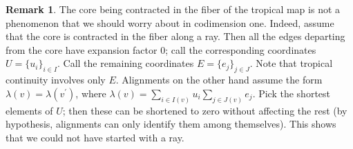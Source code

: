 \documentclass[11pt]{amsart}
\theoremstyle{definition}
\theoremstyle{definition}
\newtheorem{remark}[thm]{Remark}
\begin{document}
\begin{remark}
 The core being contracted in the fiber of the tropical map is not a phenomenon that we should worry about in codimension one. Indeed, assume that the core is contracted in the fiber along a ray. Then all the edges departing from the core have expansion factor $0$; call the corresponding coordinates $U=\{u_i\}_{i\in I}$. Call the remaining coordinates $E=\{e_j\}_{j\in J}$. Note that tropical continuity involves only $E$. Alignments on the other hand assume the form $\lambda(v)=\lambda(v^\prime)$, where $\lambda(v)=\sum_{i\in I(v)}u_i\sum_{j\in J(v)}e_j$. Pick the shortest elements of $U$; then these can be shortened to zero without affecting the rest (by hypothesis, alignments can only identify them among themselves). This shows that we could not have started with a ray.
\end{remark}
\end{document}
